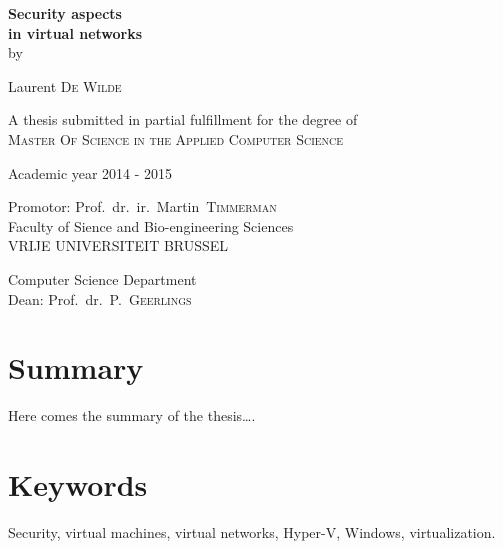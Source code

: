 
\newpage
{}
{
\setlength{\baselineskip}{12pt}
\setlength{\parindent}{0pt}
\setlength{\parskip}{6pt}

\begin{center}

\renewcommand{\baselinestretch}{1.1}
\noindent \huge \textbf{
Security aspects \\
in virtual networks
} \\
\renewcommand{\baselinestretch}{1.3}
\normalsize
\vspace{3mm}
by 

Laurent \textsc{De Wilde}

A thesis submitted in partial fulfillment for the degree  of\\
\textsc{Master Of Science in the Applied Computer Science}

Academic year 2014 - 2015

Promotor: Prof.~dr.~ir.~Martin~\textsc{Timmerman}\\

Faculty of Sience and Bio-engineering Sciences\\
VRIJE UNIVERSITEIT BRUSSEL

Computer Science Department\\
Dean: Prof.~dr.~P.~\textsc{Geerlings}

\end{center}

\section*{Summary}
Here comes the summary of the thesis\ldots .

\section*{Keywords}
Security, virtual machines, virtual networks, Hyper-V, Windows, virtualization.
}

\newpage %

